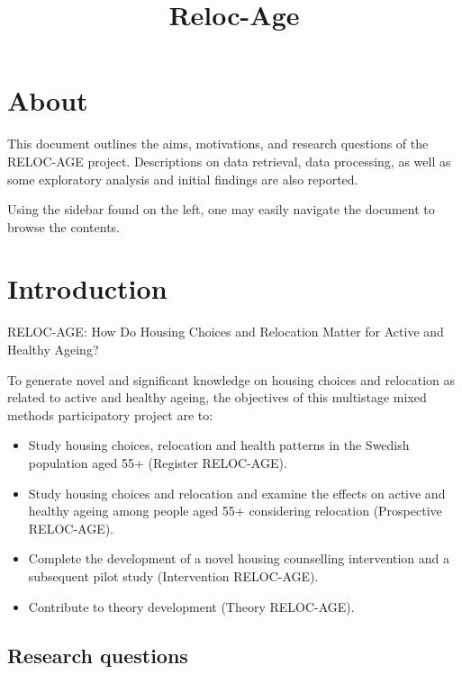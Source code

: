 \documentclass[
]{book}
\title{Reloc-Age}
\author{}
\date{\vspace{-2.5em}}
\providecommand{\tightlist}{%
  \setlength{\itemsep}{0pt}\setlength{\parskip}{0pt}}
\begin{document}
\maketitle

{
\setcounter{tocdepth}{1}
\tableofcontents
}
\hypertarget{about}{%
\chapter{About}\label{about}}

This document outlines the aims, motivations, and research questions of the RELOC-AGE project.
Descriptions on data retrieval, data processing, as well as some exploratory analysis and initial findings are also reported.

Using the sidebar found on the left, one may easily navigate the document to browse the contents.

\hypertarget{introduction}{%
\chapter{Introduction}\label{introduction}}

RELOC-AGE: How Do Housing Choices and Relocation Matter for Active and Healthy Ageing?

To generate novel and significant knowledge on housing choices and relocation as related to active and healthy ageing,
the objectives of this multistage mixed methods participatory project are to:

\begin{itemize}
\tightlist
\item
  Study housing choices, relocation and health patterns in the Swedish population aged 55+ (Register
  RELOC-AGE).
\item
  Study housing choices and relocation and examine the effects on active and healthy ageing among people
  aged 55+ considering relocation (Prospective RELOC-AGE).
\item
  Complete the development of a novel housing counselling intervention and a subsequent pilot study
  (Intervention RELOC-AGE).
\item
  Contribute to theory development (Theory RELOC-AGE).
\end{itemize}

\hypertarget{research-questions}{%
\section{Research questions}\label{research-questions}}
\end{document}
